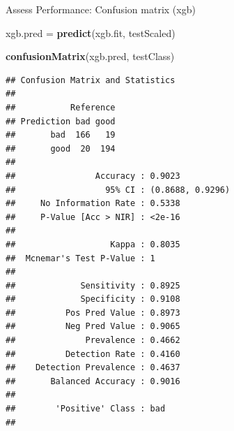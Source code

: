 \documentclass[ignorenonframetext,]{beamer}
\newenvironment{Shaded}{\begin{snugshade}}{\end{snugshade}}
\newcommand{\KeywordTok}[1]{\textcolor[rgb]{0.13,0.29,0.53}{\textbf{#1}}}
\newcommand{\StringTok}[1]{\textcolor[rgb]{0.31,0.60,0.02}{#1}}
\newcommand{\NormalTok}[1]{#1}
\begin{document}
\begin{frame}[fragile]{Assess Performance: Confusion matrix (xgb)}

\begin{Shaded}
\begin{Highlighting}[]
\NormalTok{xgb.pred =}\StringTok{ }\KeywordTok{predict}\NormalTok{(xgb.fit, testScaled)}

\KeywordTok{confusionMatrix}\NormalTok{(xgb.pred, testClass)}
\end{Highlighting}
\end{Shaded}

\begin{verbatim}
## Confusion Matrix and Statistics
## 
##           Reference
## Prediction bad good
##       bad  166   19
##       good  20  194
##                                           
##                Accuracy : 0.9023          
##                  95% CI : (0.8688, 0.9296)
##     No Information Rate : 0.5338          
##     P-Value [Acc > NIR] : <2e-16          
##                                           
##                   Kappa : 0.8035          
##  Mcnemar's Test P-Value : 1               
##                                           
##             Sensitivity : 0.8925          
##             Specificity : 0.9108          
##          Pos Pred Value : 0.8973          
##          Neg Pred Value : 0.9065          
##              Prevalence : 0.4662          
##          Detection Rate : 0.4160          
##    Detection Prevalence : 0.4637          
##       Balanced Accuracy : 0.9016          
##                                           
##        'Positive' Class : bad             
## 
\end{verbatim}

\end{frame}
\end{document}
